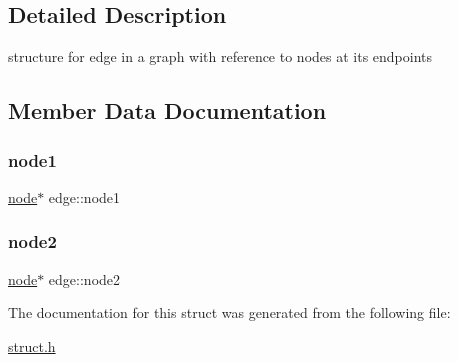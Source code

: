 \subsection{Detailed Description}
structure for edge in a graph with reference to nodes at its endpoints 

\subsection{Member Data Documentation}
\mbox{\label{structedge_a433dede2d887d02126fefe4d906c6256}} 
\subsubsection{\texorpdfstring{node1}{node1}}
{\footnotesize\ttfamily \hyperlink{structnode}{node}$\ast$ edge\+::node1}

\mbox{\label{structedge_a7afb2c92f4e69ab33b0820ff51706a2f}} 
\subsubsection{\texorpdfstring{node2}{node2}}
{\footnotesize\ttfamily \hyperlink{structnode}{node}$\ast$ edge\+::node2}



The documentation for this struct was generated from the following file\+:\begin{DoxyCompactItemize}
\item 
\hyperlink{struct_8h}{struct.\+h}\end{DoxyCompactItemize}
